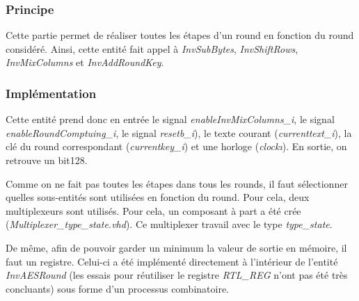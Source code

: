 \documentclass[a4paper, 12pt]{article}
\begin{document}
		\subsubsection{Principe}
Cette partie permet de réaliser toutes les étapes d'un round en fonction du round considéré. Ainsi, cette entité fait appel à \emph{InvSubBytes}, \emph{InvShiftRows}, \emph{InvMixColumns} et \emph{InvAddRoundKey}.
		\subsubsection{Implémentation}
Cette entité prend donc en entrée le signal \emph{enableInvMixColumns\_i}, le signal \emph{enableRoundComptuing\_i}, le signal \emph{resetb\_i}), le texte courant (\emph{currenttext\_i}), la clé du round correspondant (\emph{currentkey\_i}) et une horloge (\emph{clock\i}). En sortie, on retrouve un bit128.

Comme on ne fait pas toutes les étapes dans tous les rounds, il faut sélectionner quelles sous-entités sont utilisées en fonction du round. Pour cela, deux multiplexeurs sont utilisés. Pour cela, un composant à part a été crée (\emph{Multiplexer\_type\_state.vhd}). Ce multiplexer travail avec le type \emph{type\_state}.

De même, afin de pouvoir garder un minimum la valeur de sortie en mémoire, il faut un registre. Celui-ci a été implémenté directement à l'intérieur de l'entité \emph{InvAESRound} (les essais pour réutiliser le registre \emph{RTL\_REG} n'ont pas été très concluants) sous forme d'un processus combinatoire.
\end{document}
